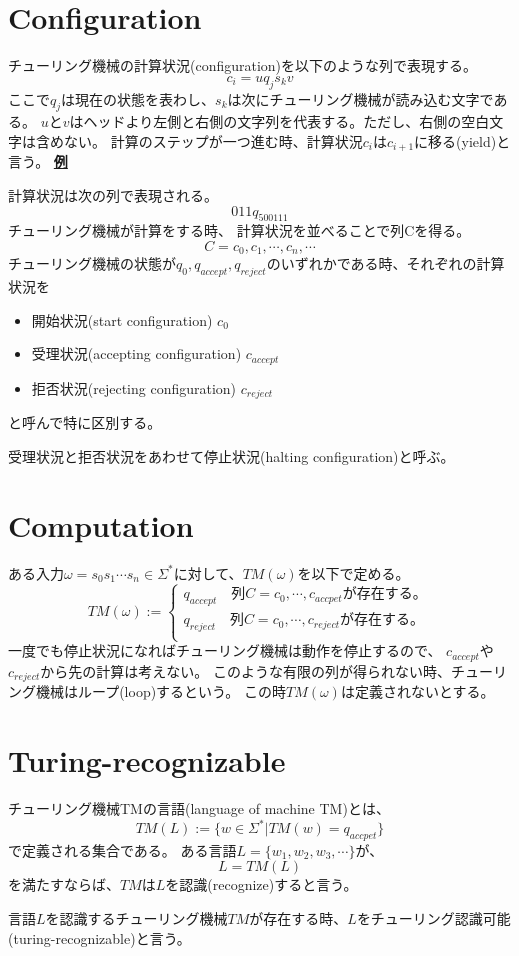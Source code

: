 \documentclass[b5paper,fleqn]{ltjsarticle}
\newcommand\ex[1]{\vskip5pt\underline{\bf 例}\quad#1\par}
\begin{document}
\section{Configuration}
チューリング機械の計算状況(configuration)を以下のような列で表現する。
\[c_i=uq_js_kv\]
ここで$q_j$は現在の状態を表わし、$s_k$は次にチューリング機械が読み込む文字である。
$u$と$v$はヘッドより左側と右側の文字列を代表する。ただし、右側の空白文字は含めない。
計算のステップが一つ進む時、計算状況$c_i$は$c_{i+1}$に移る(yield)と言う。
\ex{}

\noindent 計算状況は次の列で表現される。
\[011q_500111\]
チューリング機械が計算をする時、
計算状況を並べることで列Cを得る。
\[C=c_0,c_1,\cdots,c_n,\cdots\]
チューリング機械の状態が$q_0,q_{accept},q_{reject}$のいずれかである時、それぞれの計算状況を
\begin{itemize}
\item 開始状況(start configuration)     $c_0$
\item 受理状況(accepting configuration) $c_{accept}$ 
\item 拒否状況(rejecting configuration) $c_{reject}$
\end{itemize}
と呼んで特に区別する。\par
受理状況と拒否状況をあわせて停止状況(halting configuration)と呼ぶ。

\section{Computation}
ある入力$\omega=s_0s_1\cdots s_n\in\Sigma^*$に対して、$TM(\omega)$を以下で定める。
\[TM(\omega):=
\begin{cases}
q_{accept}\quad\text{列$C=c_0,\cdots,c_{accpet}$が存在する。}\\
q_{reject}\quad\text{列$C=c_0,\cdots,c_{reject}$が存在する。}\\
\end{cases}
\]
一度でも停止状況になればチューリング機械は動作を停止するので、
$c_{accept}$や$c_{reject}$から先の計算は考えない。
このような有限の列が得られない時、チューリング機械はループ(loop)するという。
この時$TM(\omega)$は定義されないとする。

\section{Turing-recognizable}
チューリング機械TMの言語(language of machine TM)とは、
\[TM(L):=\{w\in \Sigma^*|TM(w)=q_{accpet}\}\]
で定義される集合である。
ある言語$L=\{w_1,w_2,w_3,\cdots\}$が、
\[L=TM(L)\]
を満たすならば、$TM$は$L$を認識(recognize)すると言う。\par
言語$L$を認識するチューリング機械$TM$が存在する時、$L$をチューリング認識可能(turing-recognizable)と言う。
\end{document}
